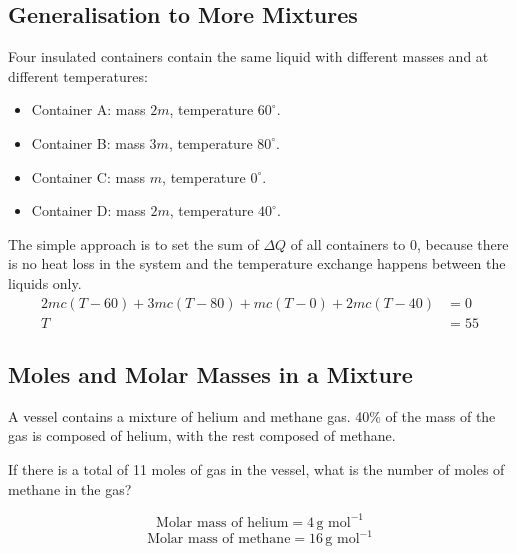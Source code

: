 \documentclass[a4paper,12pt]{article}
\newcommand{\degsym}{^{\circ}}
\begin{document}
\pagebreak

\subsection{Generalisation to More Mixtures}

Four insulated containers contain the same liquid with different masses and at different temperatures:
\begin{itemize}
  \item Container A: mass $2m$, temperature $60\degsym$.
  \item Container B: mass $3m$, temperature $80\degsym$.
  \item Container C: mass $m$, temperature $0\degsym$.
  \item Container D: mass $2m$, temperature $40\degsym$.
\end{itemize}

The simple approach is to set the sum of $\Delta Q$ of all containers to 0, because there is no heat loss in the system and the temperature exchange happens between the liquids only.
\begin{align*}
  2mc(T - 60) + 3mc(T - 80) + mc(T - 0) + 2mc(T - 40) & = 0  \\
  T                                                   & = 55
\end{align*}



\pagebreak

\subsection{Moles and Molar Masses in a Mixture}

A vessel contains a mixture of helium and methane gas. 40\% of the mass of the gas is composed of helium, with the rest composed of methane.

If there is a total of 11 moles of gas in the vessel, what is the number of moles of methane in the gas?

\[
  \text{Molar mass of helium} = 4 \, \text{g mol}^{-1}
\]
\[
  \text{Molar mass of methane} = 16 \, \text{g mol}^{-1}
\]
\end{document}
